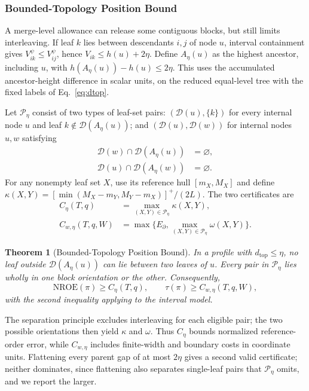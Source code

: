 \documentclass[review]{vgtc}
\newtheorem{theorem}{Theorem}
\newcommand{\dtop}{d_{\mathrm{top}}}
\newcommand{\nroe}{\mathrm{NROE}}
\begin{document}


\subsubsection{Bounded-Topology Position Bound}
A merge-level allowance can release some contiguous blocks, but still limits interleaving. If leaf $k$ lies between descendants $i,j$ of node $u$, interval containment gives $V_{ik}^{\psi}\le V_{ij}^{\psi}$, hence $V_{ik}\le h(u)+2\eta$. Define $A_\eta(u)$ as the highest ancestor, including $u$, with $h(A_\eta(u))-h(u)\le2\eta$. This uses the accumulated ancestor-height difference in scalar units, on the reduced equal-level tree with the fixed labels of Eq.~\ref{eq:dtop}.

Let $\mathcal{P}_\eta$ consist of two types of leaf-set pairs: $(\mathcal{D}(u),\{k\})$ for every internal node $u$ and leaf $k\notin\mathcal{D}(A_\eta(u))$; and $(\mathcal{D}(u),\mathcal{D}(w))$ for internal nodes $u,w$ satisfying
\begin{equation}\label{eq:separatedpairs}
\begin{aligned}
 \mathcal{D}(w)\cap\mathcal{D}(A_\eta(u))&=\varnothing,\\
 \mathcal{D}(u)\cap\mathcal{D}(A_\eta(w))&=\varnothing.
\end{aligned}
\end{equation}
For any nonempty leaf set $X$, use its reference hull $[m_X,M_X]$ and define $\kappa(X,Y)=[\min(M_X-m_Y,M_Y-m_X)]^+/(2L)$. The two certificates are
\begin{equation}\label{eq:chaindef}
\begin{aligned}
 C_\eta(T,q)&=\max_{(X,Y)\in\mathcal{P}_\eta}\kappa(X,Y),\\
 C_{w,\eta}(T,q,W)&=\max\{E_\partial,\max_{(X,Y)\in\mathcal{P}_\eta}\omega(X,Y)\}.
\end{aligned}
\end{equation}
\begin{theorem}[Bounded-Topology Position Bound]\label{thm:chain}
In a profile with $\dtop\le\eta$, no leaf outside $\mathcal{D}(A_\eta(u))$ can lie between two leaves of $u$. Every pair in $\mathcal{P}_\eta$ lies wholly in one block orientation or the other. Consequently,
\begin{equation}\label{eq:chainbounds}
 \nroe(\pi)\ge C_\eta(T,q),\qquad
 \tau(\pi)\ge C_{w,\eta}(T,q,W),
\end{equation}
with the second inequality applying to the interval model.
\end{theorem}
The separation principle excludes interleaving for each eligible pair; the two possible orientations then yield $\kappa$ and $\omega$. Thus $C_\eta$ bounds normalized reference-order error, while $C_{w,\eta}$ includes finite-width and boundary costs in coordinate units. Flattening every parent gap of at most $2\eta$ gives a second valid certificate; neither dominates, since flattening also separates single-leaf pairs that $\mathcal{P}_\eta$ omits, and we report the larger.
\end{document}
